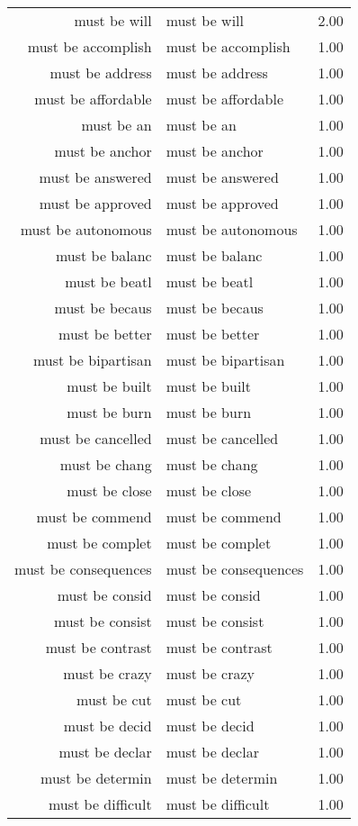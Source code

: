 \begin{table}[ht]
\begin{tabular}{rlr}
  must be will & must be will & 2.00 \\ 
  must be accomplish & must be accomplish & 1.00 \\ 
  must be address & must be address & 1.00 \\ 
  must be affordable & must be affordable & 1.00 \\ 
  must be an & must be an & 1.00 \\ 
  must be anchor & must be anchor & 1.00 \\ 
  must be answered & must be answered & 1.00 \\ 
  must be approved & must be approved & 1.00 \\ 
  must be autonomous & must be autonomous & 1.00 \\ 
  must be balanc & must be balanc & 1.00 \\ 
  must be beatl & must be beatl & 1.00 \\ 
  must be becaus & must be becaus & 1.00 \\ 
  must be better & must be better & 1.00 \\ 
  must be bipartisan & must be bipartisan & 1.00 \\ 
  must be built & must be built & 1.00 \\ 
  must be burn & must be burn & 1.00 \\ 
  must be cancelled & must be cancelled & 1.00 \\ 
  must be chang & must be chang & 1.00 \\ 
  must be close & must be close & 1.00 \\ 
  must be commend & must be commend & 1.00 \\ 
  must be complet & must be complet & 1.00 \\ 
  must be consequences & must be consequences & 1.00 \\ 
  must be consid & must be consid & 1.00 \\ 
  must be consist & must be consist & 1.00 \\ 
  must be contrast & must be contrast & 1.00 \\ 
  must be crazy & must be crazy & 1.00 \\ 
  must be cut & must be cut & 1.00 \\ 
  must be decid & must be decid & 1.00 \\ 
  must be declar & must be declar & 1.00 \\ 
  must be determin & must be determin & 1.00 \\ 
  must be difficult & must be difficult & 1.00 \\ 

\end{tabular}
\end{table}

